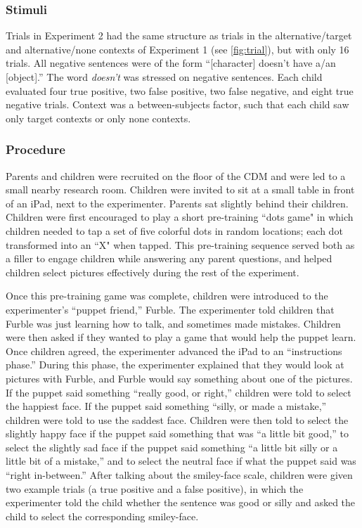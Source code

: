 \documentclass[man, noapacite]{apa2}
\begin{document}
\subsubsection{Stimuli}

Trials in Experiment 2 had the same structure as trials in the alternative/target and alternative/none contexts of Experiment 1 (see \ref{fig:trial}), but with only 16 trials. All negative sentences were of the form ``[character] doesn't have a/an [object].'' The word \emph{doesn't} was stressed on negative sentences. Each child evaluated four true positive, two false positive, two false negative, and eight true negative trials. Context was a between-subjects factor, such that each child saw only target contexts or only none contexts.

\subsubsection{Procedure}

Parents and children were recruited on the floor of the CDM and were led to a small nearby research room. Children were invited to sit at a small table in front of an iPad, next to the experimenter. Parents sat slightly behind their children. Children were first encouraged to play a short pre-training ``dots game" in which children needed to tap a set of five colorful dots in random locations; each dot transformed into an ``X" when tapped. This pre-training sequence served both as a filler to engage children while answering any parent questions, and helped children select pictures effectively during the rest of the experiment.

Once this pre-training game was complete, children were introduced to the experimenter's ``puppet friend,'' Furble. The experimenter told children that Furble was just learning how to talk, and sometimes made mistakes. Children were then asked if they wanted to play a game that would help the puppet learn. Once children agreed, the experimenter advanced the iPad to an ``instructions phase.'' During this phase, the experimenter explained that they would look at pictures with Furble, and Furble would say something about one of the pictures. If the puppet said something ``really good, or right,'' children were told to select the happiest face. If the puppet said something ``silly, or made a mistake,'' children were told to use the saddest face. Children were then told to select the slightly happy face if the puppet said something that was ``a little bit good,'' to select the slightly sad face if the puppet said something ``a little bit silly or a little bit of a mistake,'' and to select the neutral face if what the puppet said was ``right in-between.'' After talking about the smiley-face scale, children were given two example trials (a true positive and a false positive), in which the experimenter told the child whether the sentence was good or silly and asked the child to select the corresponding smiley-face.
\end{document}
